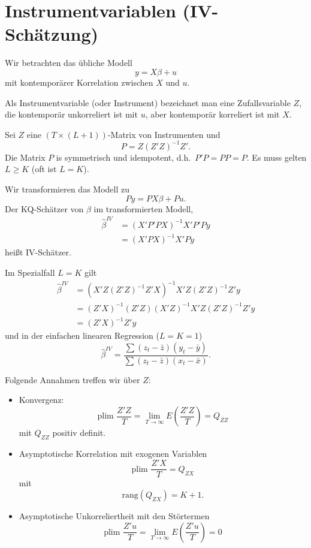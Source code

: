\documentclass{article}
\begin{document}
\section*{Instrumentvariablen (IV-Schätzung)}

Wir betrachten das übliche Modell
\[ y=X\beta+u \]
mit kontemporärer Korrelation zwischen $X$ und $u$.

Als Instrumentvariable (oder Instrument) bezeichnet man eine
Zufallsvariable $Z$, die kontemporär unkorreliert ist mit $u$, aber
kontemporär korreliert ist mit $X$.

Sei $Z$ eine $(T\times (L+1))$-Matrix von Instrumenten und
\[ P=Z(Z'Z)^{-1}Z'. \]
Die Matrix $P$ is symmetrisch und idempotent, d.h.~$P'P=PP=P$.
Es muss gelten $L\geq K$ (oft ist $L=K$).

Wir transformieren das Modell zu
\[ Py=PX\beta+Pu. \]
Der KQ-Schätzer von $\beta$ im transformierten Modell, 
\begin{align*}
\hat{\beta}^{IV} &=(X'P'PX)^{-1}X'P'Py \\
&=(X'PX)^{-1}X'Py
\end{align*}
heißt IV-Schätzer.

Im Spezialfall $L=K$ gilt
\begin{align*}
\hat{\beta}^{IV} &=(X'Z(Z'Z)^{-1}Z'X)^{-1}X'Z(Z'Z)^{-1}Z'y \\
&=(Z'X)^{-1}(Z'Z)(X'Z)^{-1}X'Z(Z'Z)^{-1}Z'y \\
&=(Z'X)^{-1}Z'y
\end{align*}
und in der einfachen linearen Regression ($L=K=1$)
\[ \hat{\beta}^{IV}=\frac{\sum \left( z_{t}-\bar{z}\right) \left( y_{t}-\bar{y}\right)}
{\sum \left( z_{t}-\bar{z}\right) \left( x_{t}-\bar{x}\right) }. \]

Folgende Annahmen treffen wir über $Z$:

\begin{itemize}
	\item Konvergenz:
	\[ \textrm{plim }\frac{Z'Z}{T}=\lim_{T\rightarrow\infty}
	E\left( \frac{Z'Z}{T}\right) =Q_{ZZ} \]
	mit $Q_{ZZ}$ positiv definit.
	\item Asymptotische Korrelation mit exogenen Variablen
	\[ \textrm{plim }\frac{Z'X}{T}=Q_{ZX} \]
	mit
	\[ \text{rang}(Q_{ZX})=K+1. \]
	\item Asymptotische Unkorreliertheit mit den Störtermen
	\[ \textrm{plim }\frac{Z'u}{T}=\lim_{T\rightarrow\infty }
	E\left( \frac{Z'u}{T}\right) =0 \]
\end{itemize}
\end{document}
